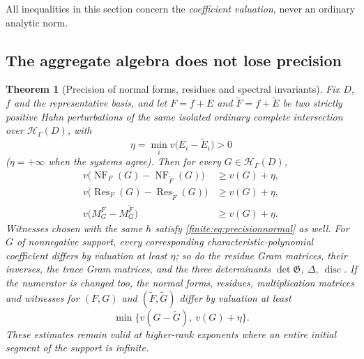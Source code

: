\documentclass[11pt,letterpaper]{article}
\newtheorem{theorem}{Theorem}[section]
\theoremstyle{definition}
\theoremstyle{remark}
\newcommand{\HH}{\mathscr H}
\newcommand{\Gram}{\mathfrak G}
\DeclareMathOperator{\NF}{NF}
\DeclareMathOperator{\Res}{Res}
\DeclareMathOperator{\disc}{disc}
\numberwithin{equation}{section}
\begin{document}
All inequalities in this section concern the \emph{coefficient valuation}, never an ordinary analytic norm.

\subsection{The aggregate algebra does not lose precision}
\label{finite:sec:precision}

\begin{theorem}[Precision of normal forms, residues and spectral invariants]
\label{finite:thm:precision}
Fix $D$, $f$ and the representative basis, and let $F=f+E$ and $\widetilde F=f+\widetilde E$ be two strictly positive Hahn perturbations of the \emph{same} isolated ordinary complete intersection over $\HH_\Gamma(D)$, with
\[
 \eta=\min_i v\bigl(E_i-\widetilde E_i\bigr)>0
\]
($\eta=+\infty$ when the systems agree). Then for every $G\in\HH_\Gamma(D)$,
\begin{align}
 v\bigl(\NF_F(G)-\NF_{\widetilde F}(G)\bigr)&\geq v(G)+\eta,
 \label{finite:eq:precisionnormal}\\
 v\bigl(\Res_F(G)-\Res_{\widetilde F}(G)\bigr)&\geq v(G)+\eta,
 \label{finite:eq:precisionresidue}\\
 v\bigl(M_G^F-M_G^{\widetilde F}\bigr)&\geq v(G)+\eta.
 \label{finite:eq:precisionmatrix}
\end{align}
Witnesses chosen with the same $h$ satisfy \eqref{finite:eq:precisionnormal} as well. For $G$ of nonnegative support, every corresponding characteristic-polynomial coefficient differs by valuation at least $\eta$; so do the residue Gram matrices, their inverses, the trace Gram matrices, and the three determinants $\det\Gram$, $\Delta$, $\disc$. If the numerator is changed too, the normal forms, residues, multiplication matrices and witnesses for $(F,G)$ and $(\widetilde F,\widetilde G)$ differ by valuation at least
\begin{equation}\label{finite:eq:inputprecision}
 \min\bigl\{v(G-\widetilde G),\ v(G)+\eta\bigr\}.
\end{equation}
These estimates remain valid at higher-rank exponents where an entire initial segment of the support is infinite.
\end{theorem}
\end{document}
